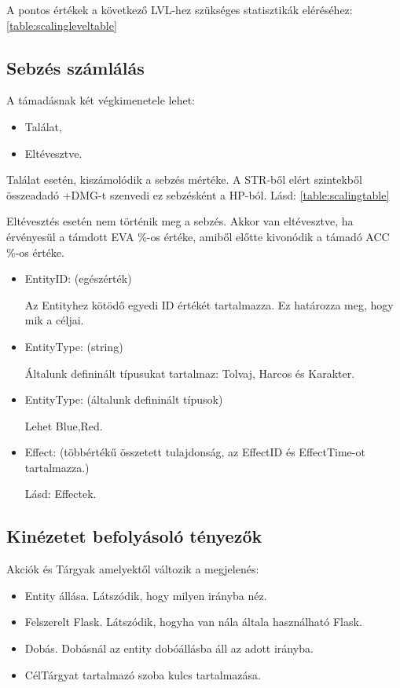 \noindent A pontos értékek a következő LVL-hez szükséges statisztikák eléréséhez: \ref{table:scalingleveltable}

\subsection{Sebzés számlálás}

A támadásnak két végkimenetele lehet:

\begin{itemize}
    \item Találat,
    \item Eltévesztve.
\end{itemize}

\noindent Találat esetén, kiszámolódik a sebzés mértéke. A STR-ből elért szintekből összeadadó +DMG-t szenvedi ez sebzésként a HP-ból. Lásd: \ref{table:scalingtable}

\noindent Eltévesztés esetén nem történik meg a sebzés. Akkor van eltévesztve, ha érvényesül a támdott EVA \%-os értéke, amiből előtte kivonódik a támadó ACC \%-os értéke.


\begin{itemize}
    \item EntityID: (egészérték)
    
    Az Entityhez kötödő egyedi ID értékét tartalmazza. Ez határozza meg, hogy mik a céljai.
    \item EntityType: (string)
    
    Általunk defininált típusukat tartalmaz: Tolvaj, Harcos és Karakter.
    \item EntityType: (általunk defininált típusok)
    
    Lehet Blue,Red.
    \item Effect: (többértékű összetett tulajdonság, az EffectID és EffectTime-ot tartalmazza.)
    
    Lásd: Effectek.
\end{itemize}

\subsection{Kinézetet befolyásoló tényezők}

\noindent Akciók és Tárgyak amelyektől változik a megjelenés:

\begin{itemize}
    \item Entity állása. Látszódik, hogy milyen irányba néz.
    \item Felszerelt Flask. Látszódik, hogyha van nála általa használható Flask.
    \item Dobás. Dobásnál az entity dobóállásba áll az adott irányba.
    \item CélTárgyat tartalmazó szoba kulcs tartalmazása.
\end{itemize}

